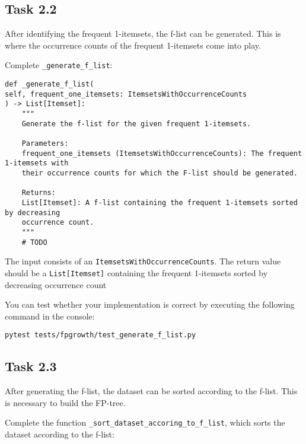 \documentclass[
english,
smallborders
]{i6prcsht}
\begin{document}
\subsection*{Task 2.2}

After identifying the frequent 1-itemsets, the f-list can be generated. This is where the occurrence counts of the frequent 1-itemsets come into play.

Complete \texttt{\_generate\_f\_list}:

\vspace*{0.3cm}

\begin{lstlisting}
def _generate_f_list(
self, frequent_one_itemsets: ItemsetsWithOccurrenceCounts
) -> List[Itemset]:
	"""
	Generate the f-list for the given frequent 1-itemsets.

	Parameters:
	frequent_one_itemsets (ItemsetsWithOccurrenceCounts): The frequent 1-itemsets with
	their occurrence counts for which the F-list should be generated.

	Returns:
	List[Itemset]: A f-list containing the frequent 1-itemsets sorted by decreasing
	occurrence count.
	"""
	# TODO
\end{lstlisting}

\vspace*{0.1cm}

The input consists of an \texttt{ItemsetsWithOccurrenceCounts}. The return value should be a \texttt{List[Itemset]} containing the frequent 1-itemsets sorted by decreasing occurrence count

You can test whether your implementation is correct by executing the following command in the console:

\vspace*{0.3cm}

\begin{lstlisting}
pytest tests/fpgrowth/test_generate_f_list.py
\end{lstlisting}

\vspace*{0.1cm}

\subsection*{Task 2.3}

After generating the f-list, the dataset can be sorted according to the f-list. This is necessary to build the FP-tree.

Complete the function \texttt{\_sort\_dataset\_accoring\_to\_f\_list}, which sorts the dataset according to the f-list:
\end{document}
